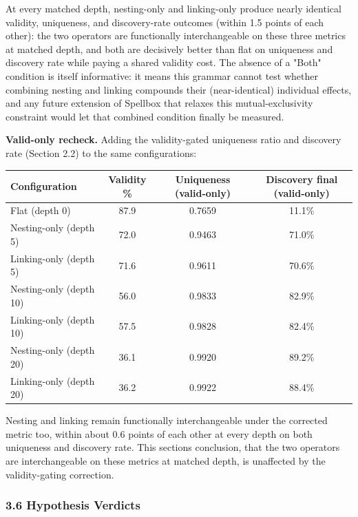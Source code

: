 \documentclass[
  10pt,
  twocolumn]{article}
\begin{document}
At every matched depth, nesting-only and linking-only produce nearly
identical validity, uniqueness, and discovery-rate outcomes (within 1.5
points of each other): the two operators are functionally
interchangeable on these three metrics at matched depth, and both are
decisively better than flat on uniqueness and discovery rate while
paying a shared validity cost. The absence of a "Both" condition is
itself informative: it means this grammar cannot test whether combining
nesting and linking compounds their (near-identical) individual effects,
and any future extension of Spellbox that relaxes this
mutual-exclusivity constraint would let that combined condition finally
be measured.

\textbf{Valid-only recheck.} Adding the validity-gated uniqueness ratio
and discovery rate (Section 2.2) to the same configurations:

\begin{table}[t]
\centering
\begin{tabular}{@{}lccc@{}}
\toprule
Configuration & Validity \% & Uniqueness (valid-only) & Discovery final
(valid-only) \\
\midrule
Flat (depth 0) & 87.9 & 0.7659 & 11.1\% \\
Nesting-only (depth 5) & 72.0 & 0.9463 & 71.0\% \\
Linking-only (depth 5) & 71.6 & 0.9611 & 70.6\% \\
Nesting-only (depth 10) & 56.0 & 0.9833 & 82.9\% \\
Linking-only (depth 10) & 57.5 & 0.9828 & 82.4\% \\
Nesting-only (depth 20) & 36.1 & 0.9920 & 89.2\% \\
Linking-only (depth 20) & 36.2 & 0.9922 & 88.4\% \\
\bottomrule
\end{tabular}
\end{table}

Nesting and linking remain functionally interchangeable under the
corrected metric too, within about 0.6 points of each other at every
depth on both uniqueness and discovery rate. This
section\textquotesingle s conclusion, that the two operators are
interchangeable on these metrics at matched depth, is unaffected by the
validity-gating correction.

\subsubsection{3.6 Hypothesis Verdicts}\label{36-hypothesis-verdicts}
\end{document}
